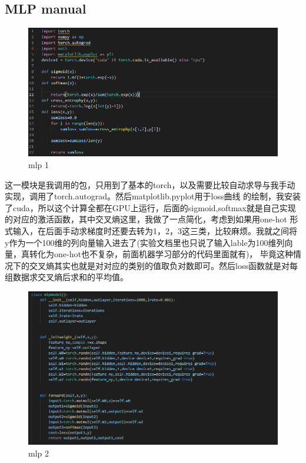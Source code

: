 \documentclass{report}
\begin{document}
    \subsection{MLP manual}
    \begin{figure}[H]
        \centering
        \includegraphics[width=15cm]{7.png}
        \caption{mlp 1}
    \end{figure}
    这一模块是我调用的包，只用到了基本的torch，以及需要比较自动求导与我手动实现，调用了torch.autograd。然后matplotlib.pyplot用于loss曲线
    的绘制，我安装了cuda，所以这个计算全都在GPU上运行，后面的sigmoid,softmax就是自己实现的对应的激活函数，其中交叉熵这里，我做了一点简化，考虑到如果用one-hot
    形式输入，在后面手动求梯度时还要去转为1，2，3这三类，比较麻烦。我就之间将y作为一个100维的列向量输入进去了(实验文档里也只说了输入lable为100维列向量，真转化为one-hot也不复杂，前面机器学习部分的代码里面就有)，
    毕竟这种情况下的交叉熵其实也就是对对应的类别的值取负对数即可。然后loss函数就是对每组数据求交叉熵后求和的平均值。\par 
    \begin{figure}[H]
        \centering
        \includegraphics[width=15cm]{8.png}
        \caption{mlp 2}
    \end{figure}
\end{document}
